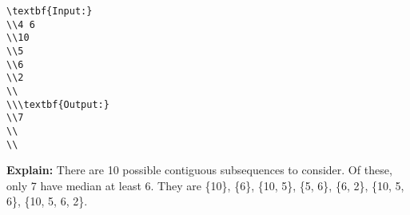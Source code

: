 \begin{verbatim}
\textbf{Input:}
\\4 6 
\\10 
\\5 
\\6 
\\2 
\\
\\\textbf{Output:}
\\7 
\\
\\\end{verbatim}

\textbf{     Explain:    }    There are 10 possible contiguous subsequences to consider. Of these, only 7 have median at least 6. They are \{10\}, \{6\}, \{10, 5\}, \{5, 6\}, \{6, 2\}, \{10, 5, 6\}, \{10, 5, 6, 2\}.